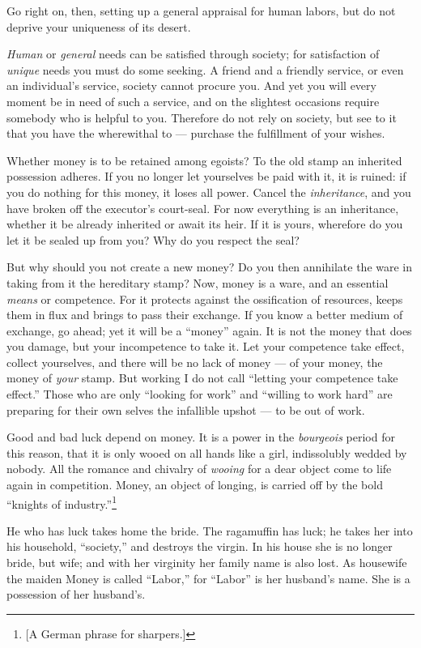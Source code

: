 Go right on, then, setting up a general appraisal for human labors, but do not 
deprive your uniqueness of its desert.

\textit{Human} or \textit{general} needs can be satisfied through society; for 
satisfaction of \textit{unique} needs you must do some seeking. A friend and a 
friendly service, or even an individual's service, society cannot procure you. 
And yet you will every moment be in need of such a service, and on the 
slightest occasions require somebody who is helpful to you. Therefore do not 
rely on society, but see to it that you have the wherewithal to --- purchase 
the fulfillment of your wishes.

Whether money is to be retained among egoists? To the old stamp an inherited 
possession adheres. If you no longer let yourselves be paid with it, it is 
ruined: if you do nothing for this money, it loses all power. Cancel the 
\textit{inheritance}, and you have broken off the executor's court-seal. For 
now everything is an inheritance, whether it be already inherited or await its 
heir. If it is yours, wherefore do you let it be sealed up from you? Why do 
you respect the seal?

But why should you not create a new money? Do you then annihilate the ware in 
taking from it the hereditary stamp? Now, money is a ware, and an essential 
\textit{means} or competence. For it protects against the ossification of 
resources, keeps them in flux and brings to pass their exchange. If you know a 
better medium of exchange, go ahead; yet it will be a ``money'' again. It is 
not the money that does you damage, but your incompetence to take it. Let your 
competence take effect, collect yourselves, and there will be no lack of money --- of your money, the money of \textit{your} stamp. But working I do not call 
``letting your competence take effect.'' Those who are only ``looking for 
work'' and ``willing to work hard'' are preparing for their own selves the 
infallible upshot --- to be out of work.

Good and bad luck depend on money. It is a power in the \textit{bourgeois} 
period for this reason, that it is only wooed on all hands like a girl, 
indissolubly wedded by nobody. All the romance and chivalry of \textit{wooing} 
for a dear object come to life again in competition. Money, an object of 
longing, is carried off by the bold ``knights of industry.''\footnote{[A 
German phrase for sharpers.]}

He who has luck takes home the bride. The ragamuffin has luck; he takes her 
into his household, ``society,'' and destroys the virgin. In his house she 
is no longer bride, but wife; and with her virginity her family name is also 
lost. As housewife the maiden Money is called ``Labor,'' for ``Labor'' is 
her husband's name. She is a possession of her husband's.

